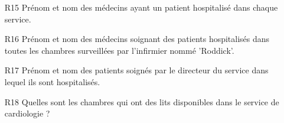 \begin{enumerate}
  \item[R15] Prénom et nom des médecins ayant un patient hospitalisé dans chaque service.
  
  \item[R16] Prénom et nom des médecins soignant des patients hospitalisés dans toutes les chambres surveillées par l'infirmier nommé 'Roddick'.
  
  \item[R17] Prénom et nom des patients soignés par le directeur du service dans lequel ils sont hospitalisés.
  
  \item[R18] Quelles sont les chambres qui ont des lits disponibles dans le service de cardiologie ?
\end{enumerate}

